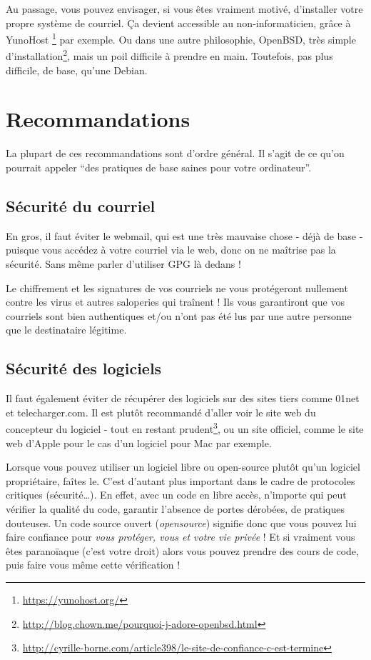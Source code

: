 Au passage, vous pouvez envisager, si vous êtes vraiment motivé,
d'installer votre propre système de courriel. Ça devient accessible au
non-informaticien, grâce à YunoHost \footnote{\url{https://yunohost.org/}} par
exemple. Ou dans une autre philosophie, OpenBSD, très simple
d'installation\footnote{\url{http://blog.chown.me/pourquoi-j-adore-openbsd.html}}, mais un poil difficile à prendre en main. Toutefois, pas plus difficile, de base, qu'une Debian.

\section{Recommandations}\label{recommandations}

\begin{notice}
La plupart de ces recommandations sont d'ordre général. Il s'agit de ce
qu'on pourrait appeler ``des pratiques de base saines pour votre
ordinateur''.
\end{notice}

\subsection{Sécurité du courriel}
En gros, il faut éviter le webmail, qui est une très mauvaise chose -
déjà de base - puisque vous accédez à votre courriel via le web, donc on
ne maîtrise pas la sécurité. Sans même parler d'utiliser GPG là dedans !

Le chiffrement et les signatures de vos courriels ne vous protégeront
nullement contre les virus et autres saloperies qui traînent ! Ils vous
garantiront que vos courriels sont bien authentiques et/ou n'ont pas été
lus par une autre personne que le destinataire légitime.

\subsection{Sécurité des logiciels}
Il faut également éviter de récupérer des logiciels sur des sites tiers
comme 01net et telecharger.com. Il est plutôt recommandé d'aller voir
le site web du concepteur du logiciel - tout en restant prudent\footnote{\url{http://cyrille-borne.com/article398/le-site-de-confiance-c-est-termine}}, ou un site officiel, comme le site web d'Apple pour le cas d'un logiciel pour Mac
par exemple.

Lorsque vous pouvez utiliser un logiciel libre ou open-source plutôt
qu'un logiciel propriétaire, faîtes le. C'est d'autant plus important
dans le cadre de protocoles critiques (sécurité\ldots{}). En effet,
avec un code en libre accès, n'importe qui peut vérifier la qualité du
code, garantir l'absence de portes dérobées, de pratiques douteuses. Un
code source ouvert (\emph{opensource}) signifie donc que vous pouvez lui
faire confiance pour \emph{vous protéger, vous et votre vie privée} ! Et
si vraiment vous êtes paranoïaque (c'est votre droit) alors vous pouvez
prendre des cours de code, puis faire vous même cette vérification !


